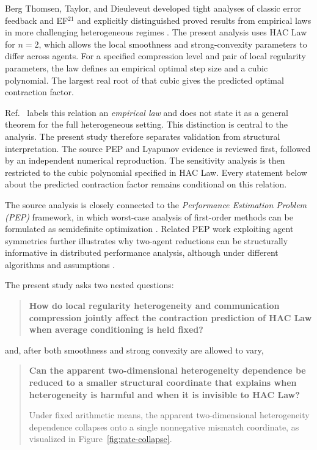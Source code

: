 Berg Thomsen, Taylor, and Dieuleveut developed tight analyses of classic error feedback and EF$^{21}$ and explicitly distinguished proved results from empirical laws in more challenging heterogeneous regimes \citep{thomsen2026tight}. The present analysis uses HAC Law for $n=2$, which allows the local smoothness and strong-convexity parameters to differ across agents. For a specified compression level and pair of local regularity parameters, the law defines an empirical optimal step size and a cubic polynomial. The largest real root of that cubic gives the predicted optimal contraction factor.

Ref.~\cite{thomsen2026tight} labels this relation an \emph{empirical law} and does not state it as a general theorem for the full heterogeneous setting. This distinction is central to the analysis. The present study therefore separates validation from structural interpretation. The source PEP and Lyapunov evidence is reviewed first, followed by an independent numerical reproduction. The sensitivity analysis is then restricted to the cubic polynomial specified in HAC Law. Every statement below about the predicted contraction factor remains conditional on this relation.

The source analysis is closely connected to the \emph{Performance Estimation Problem (PEP)} framework, in which worst-case analysis of first-order methods can be formulated as semidefinite optimization \citep{drori2014performance,taylor2017exact}. Related PEP work exploiting agent symmetries further illustrates why two-agent reductions can be structurally informative in distributed performance analysis, although under different algorithms and assumptions \citep{colla2026symmetries}.

The present study asks two nested questions:

\begin{quote}
\textbf{How do local regularity heterogeneity and communication compression jointly
affect the contraction prediction of HAC Law when average conditioning is
held fixed?}
\end{quote}

and, after both smoothness and strong convexity are allowed to vary,

\begin{quote}
\textbf{Can the apparent two-dimensional heterogeneity dependence be reduced to a
smaller structural coordinate that explains when heterogeneity is harmful and
when it is invisible to HAC Law?}

\medskip
\noindent
Under fixed arithmetic means, the apparent two-dimensional heterogeneity
dependence collapses onto a single nonnegative mismatch coordinate, as
visualized in Figure~\ref{fig:rate-collapse}.
\end{quote}


